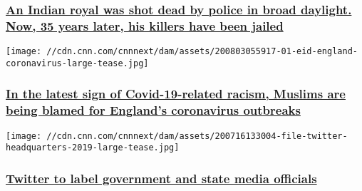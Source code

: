 \hypertarget{an-indian-royal-was-shot-dead-by-police-in-broad-daylight-now-35-years-later-his-killers-have-been-jailed}{%
\subsubsection{\texorpdfstring{\href{/2020/08/07/asia/india-maharaja-police-sentence-intl-dst-hnk/index.html}{An
Indian royal was shot dead by police in broad daylight. Now, 35 years
later, his killers have been
jailed}}{An Indian royal was shot dead by police in broad daylight. Now, 35 years later, his killers have been jailed}}\label{an-indian-royal-was-shot-dead-by-police-in-broad-daylight-now-35-years-later-his-killers-have-been-jailed}}

\href{/2020/08/06/europe/muslims-coronavirus-england-islamophobia-gbr-intl/index.html}{}

\texttt{[image: //cdn.cnn.com/cnnnext/dam/assets/200803055917-01-eid-england-coronavirus-large-tease.jpg]}

\hypertarget{in-the-latest-sign-of-covid-19-related-racism-muslims-are-being-blamed-for-englands-coronavirus-outbreaks}{%
\subsubsection{\texorpdfstring{\href{/2020/08/06/europe/muslims-coronavirus-england-islamophobia-gbr-intl/index.html}{In
the latest sign of Covid-19-related racism, Muslims are being blamed for
England's coronavirus
outbreaks}}{In the latest sign of Covid-19-related racism, Muslims are being blamed for England's coronavirus outbreaks}}\label{in-the-latest-sign-of-covid-19-related-racism-muslims-are-being-blamed-for-englands-coronavirus-outbreaks}}

\href{/2020/08/06/tech/twitter-government-state-media-labels/index.html}{}

\texttt{[image: //cdn.cnn.com/cnnnext/dam/assets/200716133004-file-twitter-headquarters-2019-large-tease.jpg]}

\hypertarget{twitter-to-label-government-and-state-media-officials}{%
\subsubsection{\texorpdfstring{\href{/2020/08/06/tech/twitter-government-state-media-labels/index.html}{Twitter
to label government and state media
officials}}{Twitter to label government and state media officials}}\label{twitter-to-label-government-and-state-media-officials}}

